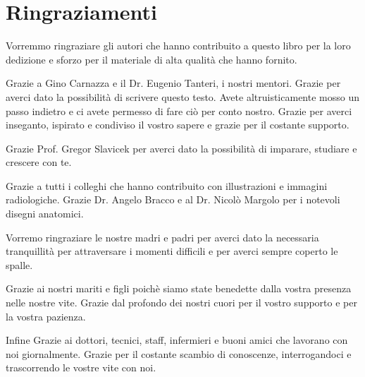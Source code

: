\documentclass[leqno,10pt,twocolumn,a4paper]{article}
\begin{document}
	\newpage
	\thispagestyle{plain}
	
	\section*{Ringraziamenti}
	
	\vspace*{0.5cm}
	Vorremmo ringraziare gli autori che hanno contribuito a questo libro per la loro dedizione e sforzo per il materiale di alta qualità che hanno fornito.\par Grazie a Gino Carnazza e il Dr. Eugenio Tanteri, i nostri mentori. Grazie per averci dato
	la possibilità di scrivere questo testo. Avete altruisticamente mosso un passo indietro e ci avete permesso di fare ciò per conto nostro. Grazie per averci inseganto, ispirato e condiviso il vostro sapere e grazie per il costante supporto.
	\par Grazie Prof. Gregor Slavicek per averci dato la possibilità di imparare, studiare e crescere con te. \par Grazie a tutti i colleghi che hanno contribuito con illustrazioni e immagini radiologiche. Grazie Dr. Angelo Bracco e al Dr. Nicolò
	Margolo per i notevoli disegni anatomici. \par Vorremo ringraziare le nostre madri e padri per averci dato la necessaria tranquillità per attraversare i momenti difficili e per averci sempre coperto le spalle. \par Grazie ai nostri mariti e 
	figli poichè siamo state benedette dalla vostra presenza nelle nostre vite. Grazie dal profondo dei nostri cuori per il vostro supporto e per la vostra pazienza. \par Infine Grazie ai dottori, tecnici, staff, infermieri e buoni amici che lavorano
	con noi giornalmente. Grazie per il costante scambio di conoscenze, interrogandoci e trascorrendo le vostre vite con noi.
	
	\newpage
	
\end{document}
